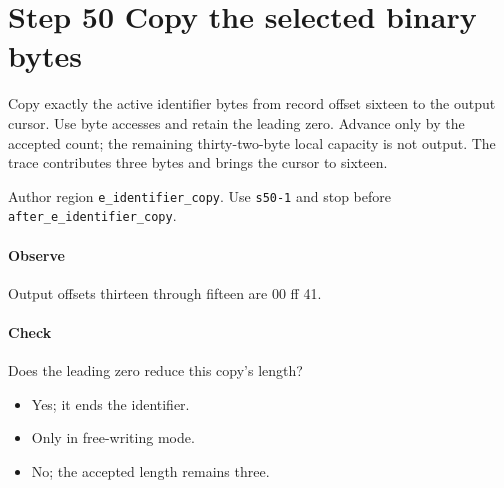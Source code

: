 \section{Step 50 Copy the selected binary bytes}\label{cbor-s50}
Copy exactly the active identifier bytes from record offset sixteen to the output cursor. Use byte accesses and retain the leading zero. Advance only by the accepted count; the remaining thirty-two-byte local capacity is not output. The trace contributes three bytes and brings the cursor to sixteen.

Author region \texttt{e\_identifier\_copy}. Use \texttt{s50-1} and stop before \texttt{after\_e\_identifier\_copy}. 

\paragraph{Observe} Output offsets thirteen through fifteen are 00 ff 41.

\paragraph{Check} Does the leading zero reduce this copy's length?
\begin{itemize}
\item[A.] Yes; it ends the identifier.
\item[B.] Only in free-writing mode.
\item[C.] No; the accepted length remains three.
\end{itemize}
